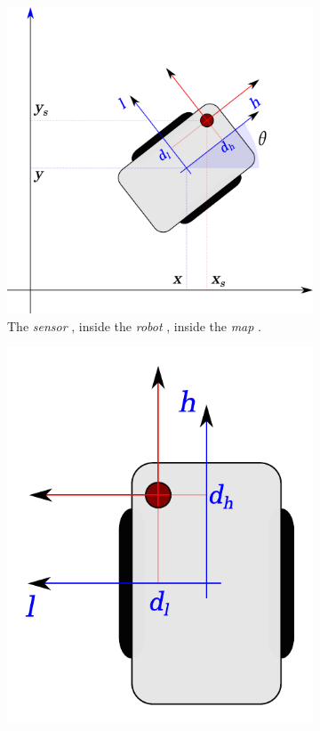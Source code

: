 \begin{figure}
	\centering
	\begin{subfigure}[b]{.58\textwidth}
		\includegraphics[width=\linewidth]{./img/frames_of_reference.pdf}
		\caption{The \emph{sensor} \FoR{}, inside the \emph{robot} \FoR{}, inside the \emph{map} \FoR{}.}
		\label{fig.fors.nested}
	\end{subfigure}
	\hfill
	\begin{subfigure}[b]{.38\textwidth}
		\includegraphics[width=\linewidth]{./img/robot_for.pdf}

\end{subfigure}
\end{figure}
